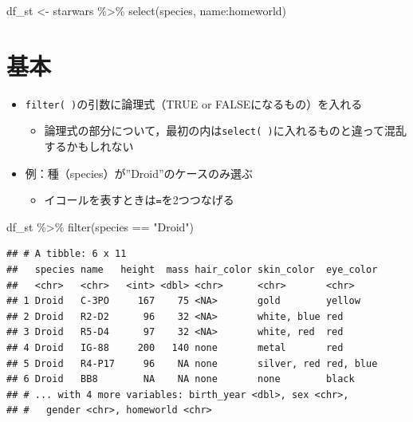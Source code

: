 \documentclass[
  xelatex,ja=standard, b5paper]{bxjsbook}
\newenvironment{Shaded}{\begin{snugshade}}{\end{snugshade}}
\newcommand{\FunctionTok}[1]{\textcolor[rgb]{0.00,0.00,0.00}{#1}}
\newcommand{\NormalTok}[1]{#1}
\newcommand{\OtherTok}[1]{\textcolor[rgb]{0.56,0.35,0.01}{#1}}
\newcommand{\SpecialCharTok}[1]{\textcolor[rgb]{0.00,0.00,0.00}{#1}}
\newcommand{\StringTok}[1]{\textcolor[rgb]{0.31,0.60,0.02}{#1}}
\providecommand{\tightlist}{%
  \setlength{\itemsep}{0pt}\setlength{\parskip}{0pt}}
\begin{document}
\begin{Shaded}
\begin{Highlighting}[]
\NormalTok{df\_st }\OtherTok{\textless{}{-}} 
\NormalTok{  starwars }\SpecialCharTok{\%\textgreater{}\%} 
  \FunctionTok{select}\NormalTok{(species, name}\SpecialCharTok{:}\NormalTok{homeworld)}
\end{Highlighting}
\end{Shaded}

\hypertarget{filter-st}{%
\section{基本}\label{filter-st}}

\begin{itemize}
\tightlist
\item
  \texttt{filter(\ )}の引数に論理式（TRUE or FALSEになるもの）を入れる

  \begin{itemize}
  \tightlist
  \item
    論理式の部分について，最初の内は\texttt{select(\ )}に入れるものと違って混乱するかもしれない
  \end{itemize}
\item
  例：種（species）が''Droid''のケースのみ選ぶ

  \begin{itemize}
  \tightlist
  \item
    イコールを表すときは\texttt{=}を2つつなげる
  \end{itemize}
\end{itemize}

\begin{Shaded}
\begin{Highlighting}[]
\NormalTok{df\_st }\SpecialCharTok{\%\textgreater{}\%} 
  \FunctionTok{filter}\NormalTok{(species }\SpecialCharTok{==} \StringTok{"Droid"}\NormalTok{)}
\end{Highlighting}
\end{Shaded}

\begin{verbatim}
## # A tibble: 6 x 11
##   species name   height  mass hair_color skin_color  eye_color
##   <chr>   <chr>   <int> <dbl> <chr>      <chr>       <chr>    
## 1 Droid   C-3PO     167    75 <NA>       gold        yellow   
## 2 Droid   R2-D2      96    32 <NA>       white, blue red      
## 3 Droid   R5-D4      97    32 <NA>       white, red  red      
## 4 Droid   IG-88     200   140 none       metal       red      
## 5 Droid   R4-P17     96    NA none       silver, red red, blue
## 6 Droid   BB8        NA    NA none       none        black    
## # ... with 4 more variables: birth_year <dbl>, sex <chr>,
## #   gender <chr>, homeworld <chr>
\end{verbatim}
\end{document}
